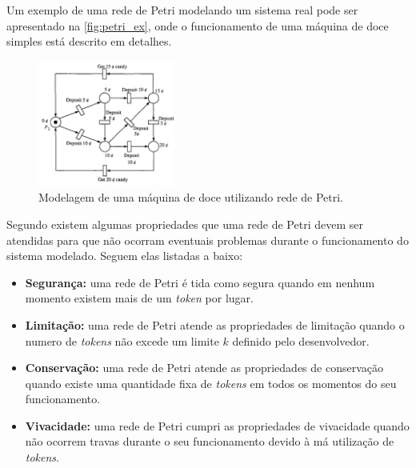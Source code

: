 Um exemplo de uma rede de Petri modelando um sistema real pode ser apresentado na \autoref{fig:petri_ex}, onde o funcionamento de uma máquina de doce simples está descrito em detalhes.

\begin{figure}[ht]
    \centering
    \includegraphics[width=0.4\textwidth, keepaspectratio]{resources/petriexemplo.png}
    \caption{Modelagem de uma máquina de doce utilizando rede de Petri. \cite{murata:1989}}
    \label{fig:petri_ex}
\end{figure}

\label{def:petri_prop}

Segundo  existem algumas propriedades que uma rede de Petri devem ser atendidas para que não ocorram eventuais problemas durante o funcionamento do sistema modelado. Seguem elas listadas a baixo:


\begin{itemize}
    \item \textbf{Segurança:} uma rede de Petri é tida como segura quando em nenhum momento existem mais de um \textit{token} por lugar. 
    \item \textbf{Limitação:} uma rede de Petri atende as propriedades de limitação quando o numero de \textit{tokens} não excede um limite $k$ definido pelo desenvolvedor.
    \item \textbf{Conservação:} uma rede de Petri atende as propriedades de conservação quando existe uma quantidade fixa de \textit{tokens} em todos os momentos do seu funcionamento.
    \item \textbf{Vivacidade:} uma rede de Petri cumpri as propriedades de vivacidade quando não ocorrem travas durante o seu funcionamento devido à má utilização de \textit{tokens}.
\end{itemize}








